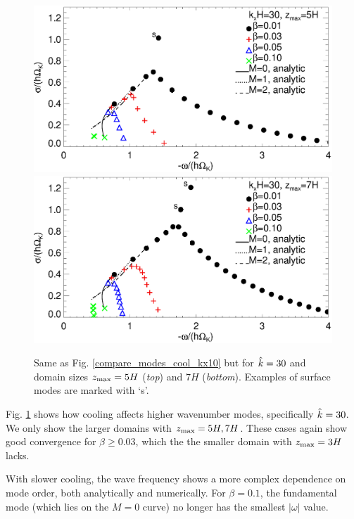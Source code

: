 \begin{figure}
  \includegraphics[width=\linewidth,clip=true,trim=0cm 1.75cm 0cm
  0cm]{figures/compare_modes_cool_kx30_z5_analytic.ps}
  \includegraphics[width=\linewidth]{figures/compare_modes_cool_kx30_z7_analytic.ps}
  \caption{Same as Fig. \ref{compare_modes_cool_kx10} but for
    $\hat{k}=30$ and domain sizes $z_\mathrm{max} = 5H$ (\emph{top}) and $7H$ (\emph{bottom}). Examples of surface modes are marked with `s'. 
    \label{compare_modes_cool_kx30} 
  }
\end{figure}

Fig. \ref{compare_modes_cool_kx30} shows how cooling affects higher wavenumber
modes, specifically $\hat{k}=30$.   We only show the larger domains with $z_\mathrm{max} = 5H, 7H$. 
These cases again show good convergence for $\beta \geq 0.03$, which the
the smaller domain with  $z_\mathrm{max} = 3H$ lacks.

With slower cooling, the wave frequency shows a more complex 
dependence on mode order, both analytically and numerically. For $\beta = 0.1$,
 the fundamental mode (which lies on the $M = 0$ curve) no longer has the smallest $|\omega|$ value.  

